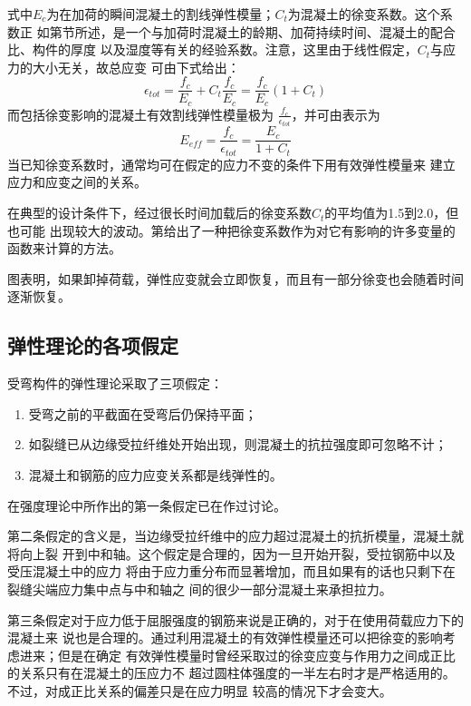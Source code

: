 \documentclass[12pt,a4paper]{book}
\begin{document}
式中$E_c$为在加荷的瞬间混凝土的割线弹性模量；$C_t$为混凝土的徐变系数。这个系数正
如第节所述，是一个与加荷时混凝土的龄期、加荷持续时间、混凝土的配合比、构件的厚度
以及湿度等有关的经验系数。注意，这里由于线性假定，$C_t$与应力的大小无关，故总应变
可由下式给出：
\begin{equation}
  \label{eq:18}
\epsilon_{tot}=\frac{f_c}{E_c}+C_t\frac{f_c}{E_c}=\frac{f_c}{E_c}(1+C_t)
\end{equation}而包括徐变影响的混凝土有效割线弹性模量极为
$\frac{f_c}{\epsilon_{tot}}$，并可由表示为
\begin{equation}
  \label{eq:19} E_{eff}=\frac{f_c}{\epsilon_{tot}}=\frac{E_c}{1+C_t}
\end{equation}当已知徐变系数时，通常均可在假定的应力不变的条件下用有效弹性模量来
建立应力和应变之间的关系。

在典型的设计条件下，经过很长时间加载后的徐变系数$C_t$的平均值为1.5到2.0，但也可能
出现较大的波动。第给出了一种把徐变系数作为对它有影响的许多变量的函数来计算的方法。

图表明，如果卸掉荷载，弹性应变就会立即恢复，而且有一部分徐变也会随着时间逐渐恢复。

\subsection{弹性理论的各项假定}

受弯构件的弹性理论采取了三项假定：
\begin{enumerate}
\item 受弯之前的平截面在受弯后仍保持平面；
\item 如裂缝已从边缘受拉纤维处开始出现，则混凝土的抗拉强度即可忽略不计；
\item 混凝土和钢筋的应力应变关系都是线弹性的。
\end{enumerate}

在强度理论中所作出的第一条假定已在作过讨论。

第二条假定的含义是，当边缘受拉纤维中的应力超过混凝土的抗折模量，混凝土就将向上裂
开到中和轴。这个假定是合理的，因为一旦开始开裂，受拉钢筋中以及受压混凝土中的应力
将由于应力重分布而显著增加，而且如果有的话也只剩下在裂缝尖端应力集中点与中和轴之
间的很少一部分混凝土来承担拉力。

第三条假定对于应力低于屈服强度的钢筋来说是正确的，对于在使用荷载应力下的混凝土来
说也是合理的。通过利用混凝土的有效弹性模量还可以把徐变的影响考虑进来；但是在确定
有效弹性模量时曾经采取过的徐变应变与作用力之间成正比的关系只有在混凝土的压应力不
超过圆柱体强度的一半左右时才是严格适用的。不过，对成正比关系的偏差只是在应力明显
较高的情况下才会变大。
\end{document}
